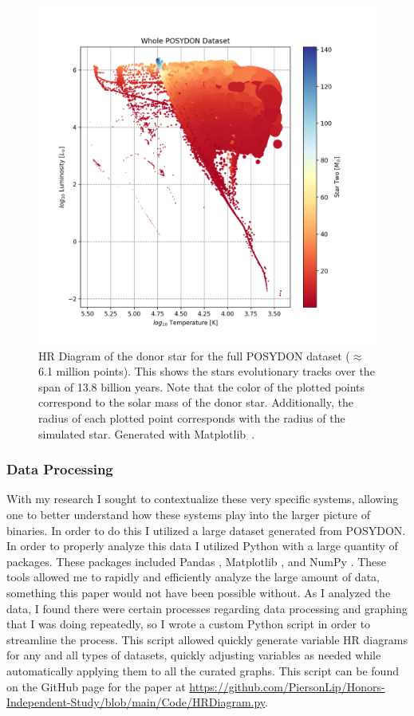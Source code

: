\documentclass[12pt, a4paper]{article}
\begin{document}
        \begin{figure}[H]
            \centering
            \includegraphics[width = \textwidth]{figs/GeneratedFigs/WholePOSYDONDatasetExample.png}
            \caption{HR Diagram of the donor star for the full POSYDON dataset ($\approx$6.1 million points). This shows the stars evolutionary tracks over the span of 13.8 billion years. Note that the color of the plotted points correspond to the solar mass of the donor star. Additionally, the radius of each plotted point corresponds with the radius of the simulated star. Generated with Matplotlib~\parencite{Matplotlib}.}
            \label{EntireDataSetHR}
        \end{figure}

        \subsubsection{Data Processing}
            With my research I sought to contextualize these very specific systems, allowing one to better understand how these systems play into the larger picture of binaries. In order to do this I utilized a large dataset generated from POSYDON. In order to properly analyze this data I utilized Python with a large quantity of packages. These packages included Pandas \parencite{reback2020pandas}, Matplotlib \parencite{Matplotlib}, and NumPy \parencite{harris2020array}. These tools allowed me to rapidly and efficiently analyze the large amount of data, something this paper would not have been possible without.  As I analyzed the data, I found there were certain processes regarding data processing and graphing that I was doing repeatedly, so I wrote a custom Python script in order to streamline the process. This script allowed quickly generate variable HR diagrams for any and all types of datasets, quickly adjusting variables as needed while automatically applying them to all the curated graphs. This script can be found on the GitHub page for the paper at \url{https://github.com/PiersonLip/Honors-Independent-Study/blob/main/Code/HRDiagram.py}.
\end{document}
